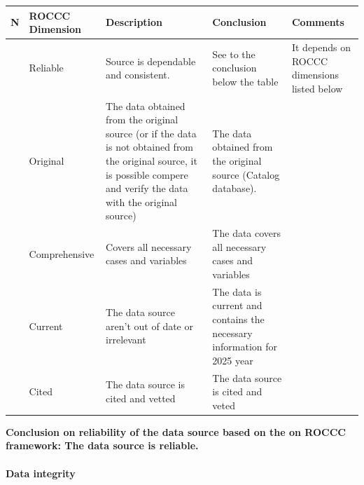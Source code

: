 \documentclass[
]{article}
\begin{document}
\begin{longtable}[]{@{}
  >{\raggedright\arraybackslash}p{}
  >{\raggedright\arraybackslash}p{}
  >{\raggedright\arraybackslash}p{}
  >{\raggedright\arraybackslash}p{}
  >{\raggedright\arraybackslash}p{}@{}}
\toprule\noalign{}
\begin{minipage}[b]{\linewidth}\raggedright
N
\end{minipage} & \begin{minipage}[b]{\linewidth}\raggedright
ROCCC Dimension
\end{minipage} & \begin{minipage}[b]{\linewidth}\raggedright
Description
\end{minipage} & \begin{minipage}[b]{\linewidth}\raggedright
Conclusion
\end{minipage} & \begin{minipage}[b]{\linewidth}\raggedright
Comments
\end{minipage} \\
\midrule\noalign{}
\endhead
\bottomrule\noalign{}
\endlastfoot
1 & Reliable & Source is dependable and consistent. & See to the
conclusion below the table & It depends on ROCCC dimensions listed
below \\
2 & Original & The data obtained from the original source (or if the
data is not obtained from the original source, it is possible compere
and verify the data with the original source) & The data obtained from
the original source (Catalog database). & \\
3 & Comprehensive & Covers all necessary cases and variables & The data
covers all necessary cases and variables & \\
4 & Current & The data source aren't out of date or irrelevant & The
data is current and contains the necessary information for 2025 year
& \\
5 & Cited & The data source is cited and vetted & The data source is
cited and veted & \\
\end{longtable}

\textbf{Conclusion on reliability of the data source based on the on
ROCCC framework: The data source is reliable.}

\paragraph{\texorpdfstring{\textbf{Data
integrity}}{Data integrity}}\label{data-integrity}
\end{document}
